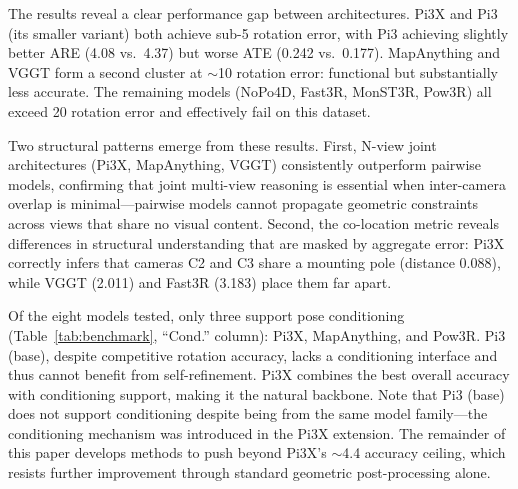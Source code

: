 The results reveal a clear performance gap between architectures. Pi3X and Pi3 (its smaller variant) both achieve sub-5\degree{} rotation error, with Pi3 achieving slightly better ARE (4.08\degree{} vs.\ 4.37\degree{}) but worse ATE (0.242 vs.\ 0.177). MapAnything and VGGT form a second cluster at $\sim$10\degree{} rotation error: functional but substantially less accurate. The remaining models (NoPo4D, Fast3R, MonST3R, Pow3R) all exceed 20\degree{} rotation error and effectively fail on this dataset.

Two structural patterns emerge from these results. First, N-view joint architectures (Pi3X, MapAnything, VGGT) consistently outperform pairwise models, confirming that joint multi-view reasoning is essential when inter-camera overlap is minimal---pairwise models cannot propagate geometric constraints across views that share no visual content. Second, the co-location metric reveals differences in structural understanding that are masked by aggregate error: Pi3X correctly infers that cameras C2 and C3 share a mounting pole (distance 0.088), while VGGT (2.011) and Fast3R (3.183) place them far apart.

Of the eight models tested, only three support pose conditioning (Table~\ref{tab:benchmark}, ``Cond.'' column): Pi3X, MapAnything, and Pow3R. Pi3 (base), despite competitive rotation accuracy, lacks a conditioning interface and thus cannot benefit from self-refinement. Pi3X combines the best overall accuracy with conditioning support, making it the natural backbone. Note that Pi3 (base) does not support conditioning despite being from the same model family---the conditioning mechanism was introduced in the Pi3X extension. The remainder of this paper develops methods to push beyond Pi3X's $\sim$4.4\degree{} accuracy ceiling, which resists further improvement through standard geometric post-processing alone.
